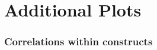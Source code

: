 \documentclass{article}
\begin{document}

% 
% 

\section{Additional Plots}

\subsubsection*{Correlations within constructs}

\end{document}
